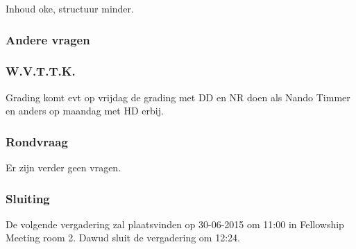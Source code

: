 Inhoud oke, structuur minder.

\subsubsection{Andere vragen}

\subsubsection{W.V.T.T.K.}
Grading komt evt op vrijdag de grading met DD en NR doen als Nando Timmer en anders op maandag met HD erbij.

\subsubsection{Rondvraag}
Er zijn verder geen vragen.

\subsubsection{Sluiting}
De volgende vergadering zal plaatsvinden op 30-06-2015 om 11:00 in Fellowship Meeting room 2.
\newline\newline
Dawud sluit de vergadering om 12:24.